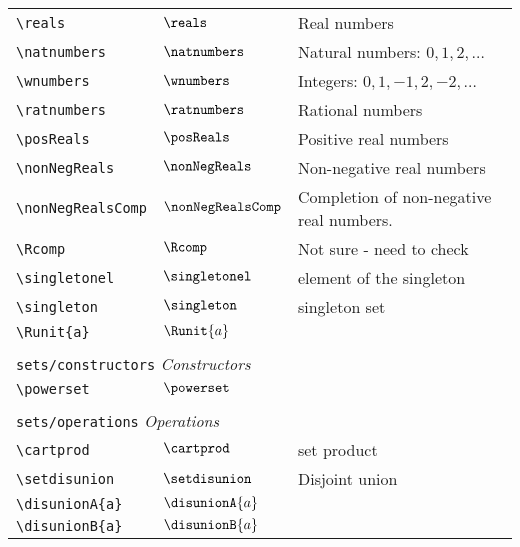 \begin{longtable}{lll}
 {\color[rgb]{0.5,0.5,0.5}\texttt{\textbackslash reals}} & $\reals$ &  Real numbers\\ 
 {\color[rgb]{0.5,0.5,0.5}\texttt{\textbackslash natnumbers}} & $\natnumbers$ &  Natural numbers: $0, 1, 2, \dots$\\ 
 {\color[rgb]{0.5,0.5,0.5}\texttt{\textbackslash wnumbers}} & $\wnumbers$ &  Integers: $0, 1, -1, 2, -2, \dots$\\ 
 {\color[rgb]{0.5,0.5,0.5}\texttt{\textbackslash ratnumbers}} & $\ratnumbers$ &  Rational numbers\\ 
 {\color[rgb]{0.5,0.5,0.5}\texttt{\textbackslash posReals}} & $\posReals$ &  Positive real numbers\\ 
 {\color[rgb]{0.5,0.5,0.5}\texttt{\textbackslash nonNegReals}} & $\nonNegReals$ &  Non-negative real numbers\\ 
 {\color[rgb]{0.5,0.5,0.5}\texttt{\textbackslash nonNegRealsComp}} & $\nonNegRealsComp$ &  Completion of non-negative real numbers.\\ 
 {\color[rgb]{0.5,0.5,0.5}\texttt{\textbackslash Rcomp}} & $\Rcomp$ &  Not sure - need to check\\ 
 {\color[rgb]{0.5,0.5,0.5}\texttt{\textbackslash singletonel}} & $\singletonel$ &  element of the singleton\\ 
 {\color[rgb]{0.5,0.5,0.5}\texttt{\textbackslash singleton}} & $\singleton$ &  singleton set\\ 
 {\color[rgb]{0.5,0.5,0.5}\texttt{\textbackslash Runit\{a\}}} & $\Runit{a}$ & \\ 
  &  & \\ 
 \multicolumn{3}{l}{{\color[rgb]{0.5,0.5,0.5}\texttt{sets/constructors}} \emph{Constructors}}\\ 
 \hline
{\color[rgb]{0.5,0.5,0.5}\texttt{\textbackslash powerset}} & $\powerset$ & \\ 
  &  & \\ 
 \multicolumn{3}{l}{{\color[rgb]{0.5,0.5,0.5}\texttt{sets/operations}} \emph{Operations}}\\ 
 \hline
{\color[rgb]{0.5,0.5,0.5}\texttt{\textbackslash cartprod}} & $\cartprod$ &  set product\\ 
 {\color[rgb]{0.5,0.5,0.5}\texttt{\textbackslash setdisunion}} & $\setdisunion$ &  Disjoint union\\ 
 {\color[rgb]{0.5,0.5,0.5}\texttt{\textbackslash disunionA\{a\}}} & $\disunionA{a}$ & \\ 
 {\color[rgb]{0.5,0.5,0.5}\texttt{\textbackslash disunionB\{a\}}} & $\disunionB{a}$ & \\ 

\end{longtable}

